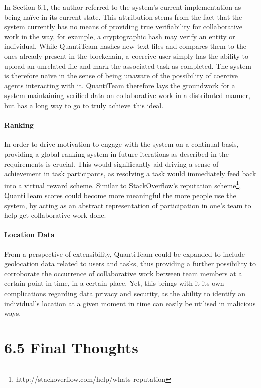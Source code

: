 In Section 6.1, the author referred to the system's current
implementation as being naïve in its current state. This attribution
stems from the fact that the system currently has no means of providing
true verifiability for collaborative work in the way, for example, a
cryptographic hash may verify an entity or individual. While QuantiTeam
hashes new text files and compares them to the ones already present in
the blockchain, a coercive user simply has the ability to upload an
unrelated file and mark the associated task as completed. The system is
therefore naïve in the sense of being unaware of the possibility of
coercive agents interacting with it. QuantiTeam therefore lays the
groundwork for a system maintaining verified data on collaborative work
in a distributed manner, but has a long way to go to truly achieve this
ideal.

\paragraph{Ranking}\label{ranking}

In order to drive motivation to engage with the system on a continual
basis, providing a global ranking system in future iterations as
described in the requirements is crucial. This would significantly aid
driving a sense of achievement in task participants, as resolving a task
would immediately feed back into a virtual reward scheme. Similar to
StackOverflow's reputation
scheme\footnote{http://stackoverflow.com/help/whats-reputation}, QuantiTeam scores could become more meaningful the more
people use the system, by acting as an abstract representation of
participation in one's team to help get collaborative work done.

\paragraph{Location Data}\label{location-data}

From a perspective of extensibility, QuantiTeam could be expanded to
include geolocation data related to users and tasks, thus providing a
further possibility to corroborate the occurrence of collaborative work
between team members at a certain point in time, in a certain place.
Yet, this brings with it its own complications regarding data privacy
and security, as the ability to identify an individual's location at a
given moment in time can easily be utilised in malicious ways.

\section{6.5 Final Thoughts}\label{final-thoughts}

